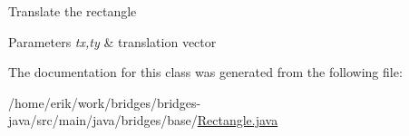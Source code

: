 Translate the rectangle


\begin{DoxyParams}{Parameters}
{\em tx,ty} & translation vector \\
\hline
\end{DoxyParams}


The documentation for this class was generated from the following file\+:\begin{DoxyCompactItemize}
\item 
/home/erik/work/bridges/bridges-\/java/src/main/java/bridges/base/\hyperlink{_rectangle_8java}{Rectangle.\+java}\end{DoxyCompactItemize}
